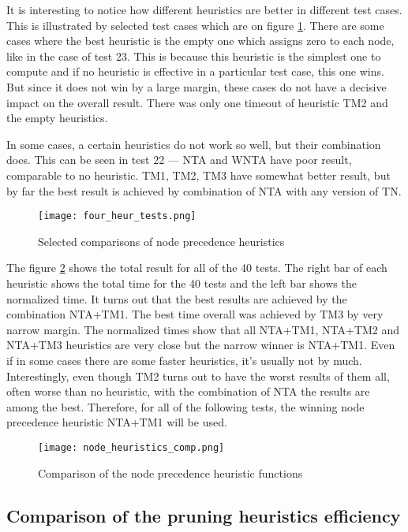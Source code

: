 It is interesting to notice how different heuristics are better in different test cases. This is illustrated by selected test cases which are on figure \ref{fig:selected_tests}. There are some cases where the best heuristic is the empty one which assigns zero to each node, like in the case of test 23. This is because this heuristic is the simplest one to compute and if no heuristic is effective in a particular test case, this one wins. But since it does not win by a large margin, these cases do not have a decisive impact on the overall result. There was only one timeout of heuristic TM2 and the empty heuristics.

In some cases, a certain heuristics do not work so well, but their combination does. This can be seen in test 22 --- NTA and WNTA have poor result, comparable to no heuristic. TM1, TM2, TM3 have somewhat better result, but by far the best result is achieved by combination of NTA with any version of TN.

\begin{figure}[h!]
  \texttt{[image: four\_heur\_tests.png]}
  \caption{Selected comparisons of node precedence heuristics}
  \label{fig:selected_tests}
\end{figure}

The figure \ref{fig:node_heuristics_comp} shows the total result for all of the 40 tests. The right bar of each heuristic shows the total time for the 40 tests and the left bar shows the normalized time. It turns out that the best results are achieved by the combination NTA+TM1. The best time overall was achieved by TM3 by very narrow margin. The normalized times show that all NTA+TM1, NTA+TM2 and NTA+TM3 heuristics are very close but the narrow winner is NTA+TM1. Even if in some cases there are some faster heuristics, it's usually not by much. Interestingly, even though TM2 turns out to have the worst results of them all, often worse than no heuristic, with the combination of NTA the results are among the best. Therefore, for all of the following tests, the winning node precedence heuristic NTA+TM1 will be used.

\begin{figure}[h!]
  \texttt{[image: node\_heuristics\_comp.png]}
  \caption{Comparison of the node precedence heuristic functions}
  \label{fig:node_heuristics_comp}
\end{figure}

\subsection{Comparison of the pruning heuristics efficiency} \label{section:pruning_test}

